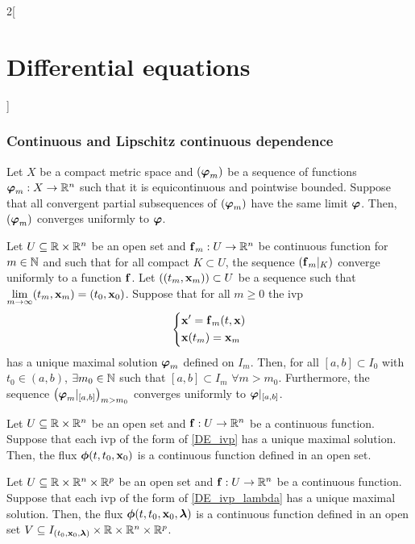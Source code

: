 \documentclass[../../../main.tex]{subfiles}
\begin{document}
\begin{multicols}{2}[\section{Differential equations}]
    \subsubsection{Continuous and Lipschitz continuous dependence}
    \begin{lemma}
        Let $X$ be a compact metric space and $(\boldsymbol{\mathrm{\varphi}}_m)$ be a sequence of functions $\boldsymbol{\mathrm{\varphi}}_m:X\rightarrow\mathbb{R}^n$ such that it is equicontinuous and pointwise bounded. Suppose that all convergent partial subsequences of $(\boldsymbol{\mathrm{\varphi}}_m)$ have the same limit $\boldsymbol{\mathrm{\varphi}}$. Then, $(\boldsymbol{\mathrm{\varphi}}_m)$ converges uniformly to $\boldsymbol{\mathrm{\varphi}}$.
    \end{lemma}
    \begin{prop}
        Let $U\subseteq\mathbb{R}\times\mathbb{R}^n$ be an open set and $\boldsymbol{\mathrm{f}}_m:U\rightarrow\mathbb{R}^n$ be continuous function for $m\in\mathbb{N}$ and such that for all compact $K\subset U$, the sequence $(\boldsymbol{\mathrm{f}}_m|_K)$ converge uniformly to a function $\boldsymbol{\mathrm{f}}$. Let $((t_m,\boldsymbol{\mathrm{x}}_m))\subset U$ be a sequence such that $\displaystyle\lim_{m\to\infty}(t_m,\boldsymbol{\mathrm{x}}_m)=(t_0,\boldsymbol{\mathrm{x}}_0)$. Suppose that for all $m\geq 0$ the ivp
        \begin{equation*}
            \left\{
            \begin{aligned}
                 & \boldsymbol{\mathrm{x}}'      =\boldsymbol{\mathrm{f}}_m(t,\boldsymbol{\mathrm{x}}) \\
                 & \boldsymbol{\mathrm{x}}(t_m)  =\boldsymbol{\mathrm{x}}_m
            \end{aligned}
            \right.
        \end{equation*}
        has a unique maximal solution $\boldsymbol{\mathrm{\varphi}}_m$ defined on $I_m$. Then, for all $[a,b]\subset I_0$ with $t_0\in(a,b)$, $\exists m_0\in\mathbb{N}$ such that $[a,b]\subset I_m$ $\forall m>m_0$. Furthermore, the sequence $\left(\boldsymbol{\mathrm{\varphi}}_m|_{[a,b]}\right)_{m>m_0}$ converges uniformly to $\boldsymbol{\mathrm{\varphi}}|_{[a,b]}$.
    \end{prop}
    \begin{theorem}
        Let $U\subseteq\mathbb{R}\times\mathbb{R}^n$ be an open set and $\boldsymbol{\mathrm{f}}:U\rightarrow\mathbb{R}^n$ be a continuous function. Suppose that each ivp of the form of \cref{DE_ivp} has a unique maximal solution. Then, the flux $\boldsymbol{\mathrm{\phi}}(t,t_0,\boldsymbol{\mathrm{x}}_0)$ is a continuous function defined in an open set.
    \end{theorem}
    \begin{theorem}
        Let $U\subseteq\mathbb{R}\times\mathbb{R}^n\times\mathbb{R}^p$ be an open set and $\boldsymbol{\mathrm{f}}:U\rightarrow\mathbb{R}^n$ be a continuous function. Suppose that each ivp of the form of \cref{DE_ivp_lambda} has a unique maximal solution. Then, the flux $\boldsymbol{\mathrm{\phi}}(t,t_0,\boldsymbol{\mathrm{x}}_0,\boldsymbol{\mathrm{\lambda}})$ is a continuous function defined in an open set $V\subseteq I_{(t_0,\boldsymbol{\mathrm{x}}_0,\boldsymbol{\mathrm{\lambda}})}\times\mathbb{R}\times\mathbb{R}^n\times\mathbb{R}^p$.

\end{theorem}
\end{multicols}
\end{document}
